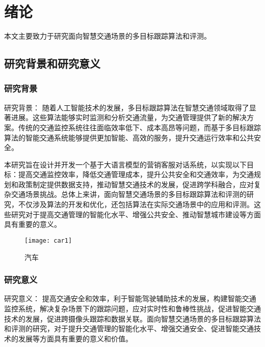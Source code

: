 \chapter{绪论}

本文主要致力于研究面向智慧交通场景的多目标跟踪算法和评测。

\section{研究背景和研究意义}

\subsection{研究背景}

研究背景：
随着人工智能技术的发展，多目标跟踪算法在智慧交通领域取得了显著进展。这些算法能够实时监测和分析交通流量，为交通管理提供了新的解决方案。传统的交通监控系统往往面临效率低下、成本高昂等问题，而基于多目标跟踪算法的智能交通系统能够提供更加智能、高效的服务，提升交通运行效率和公共安全\cite{dollar2016unified}。

本研究旨在设计并开发一个基于大语言模型的营销客服对话系统，以实现以下目标：提高交通监控效率，降低交通管理成本，提升公共安全和交通效率，为交通规划和政策制定提供数据支持，推动智慧交通技术的发展，促进跨学科融合，应对复杂交通场景挑战。总体上来讲，面向智慧交通场景的多目标跟踪算法和评测的研究，不仅涉及算法的开发和优化，还包括算法在实际交通场景中的应用和评测。这些研究对于提高交通管理的智能化水平、增强公共安全、推动智慧城市建设等方面具有重要的意义\cite{wojke2017simple}。


\begin{figure}[htbp] %
	\centering
	\texttt{[image: car1]} %
	\caption{汽车} %
	\label{fig:car1} %
\end{figure}



\subsection{研究意义}

研究意义：
提高交通安全和效率，利于智能驾驶辅助技术的发展，构建智能交通监控系统，解决复杂场景下的跟踪问题，应对实时性和鲁棒性挑战，促进智能交通技术的发展，促进跨摄像头跟踪和数据关联。面向智慧交通场景的多目标跟踪算法和评测的研究，对于提升交通管理的智能化水平、增强交通安全、促进智能交通技术的发展等方面具有重要的意义和价值。\cite{yu2020deep}


